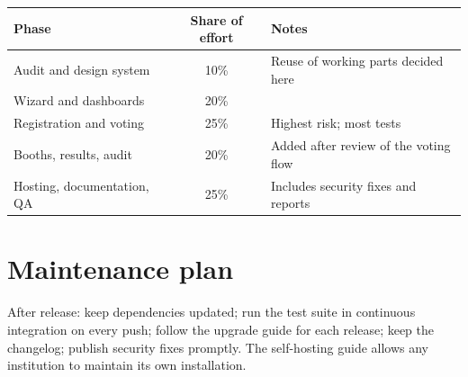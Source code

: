 \begin{center}
\small
\begin{tabularx}{\linewidth}{@{}l c X@{}}
\toprule
\textbf{Phase} & \textbf{Share of effort} & \textbf{Notes} \\
\midrule
Audit and design system & 10\% & Reuse of working parts decided here \\
Wizard and dashboards & 20\% & \\
Registration and voting & 25\% & Highest risk; most tests \\
Booths, results, audit & 20\% & Added after review of the voting flow \\
Hosting, documentation, QA & 25\% & Includes security fixes and reports \\
\bottomrule
\end{tabularx}
\end{center}

\section{Maintenance plan}

After release: keep dependencies updated; run the test suite in continuous integration on every push; follow the upgrade guide for each release; keep the changelog; publish security fixes promptly. The self-hosting guide allows any institution to maintain its own installation.

